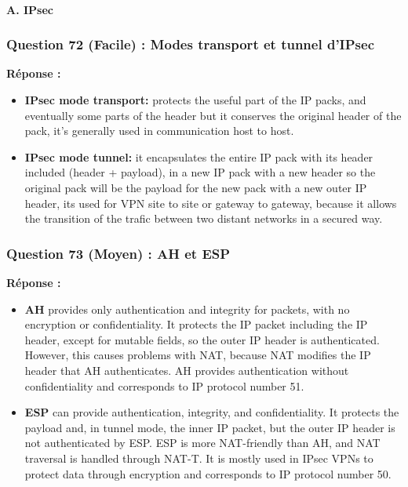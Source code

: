 \documentclass[12pt,a4paper]{article}
\newcommand{\reponse}{\textbf{Réponse :}\par}
\begin{document}
\paragraph{A. IPsec}

\subsubsection*{Question 72 (Facile) : Modes transport et tunnel d'IPsec}

\reponse
\begin{itemize}
    \item \textbf{IPsec mode transport:} protects the useful part of
    the IP packs, and eventually some parts of the header but it
    conserves the original header of the pack, it's generally used in
    communication host to host.
    \item \textbf{IPsec mode tunnel:} it encapsulates the entire IP pack
    with its header included (header + payload), in a new IP pack with
    a new header so the original pack will be the payload for the new
    pack with a new outer IP header, its used for VPN site to site or
    gateway to gateway, because it allows the transition of the trafic
    between two distant networks in a secured way.
\end{itemize}

\subsubsection*{Question 73 (Moyen) : AH et ESP}

\reponse
\begin{itemize}
    \item \textbf{AH} provides only authentication and integrity for
    packets, with no encryption or confidentiality. It protects the IP
    packet including the IP header, except for mutable fields, so the
    outer IP header is authenticated. However, this causes problems
    with NAT, because NAT modifies the IP header that AH authenticates.
    AH provides authentication without confidentiality and corresponds
    to IP protocol number 51.
    \item \textbf{ESP} can provide authentication, integrity, and
    confidentiality. It protects the payload and, in tunnel mode, the
    inner IP packet, but the outer IP header is not authenticated by
    ESP. ESP is more NAT-friendly than AH, and NAT traversal is handled
    through NAT-T. It is mostly used in IPsec VPNs to protect data
    through encryption and corresponds to IP protocol number 50.
\end{itemize}
\end{document}

